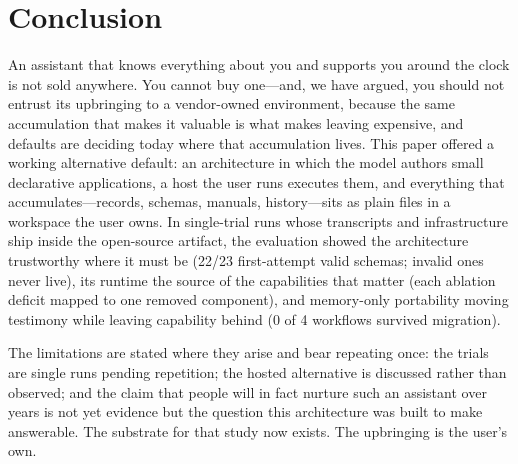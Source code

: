 \documentclass[11pt]{article}
\begin{document}
\section{Conclusion}
\label{sec:conclusion}

An assistant that knows everything about you and supports you around the clock
is not sold anywhere. You cannot buy one---and, we have argued, you should not
entrust its upbringing to a vendor-owned environment, because the same
accumulation that makes it valuable is what makes
leaving expensive, and defaults are deciding today where that accumulation lives.
This paper offered a working alternative default: an architecture in which the
model authors small declarative applications, a host the user runs executes them,
and everything that accumulates---records, schemas, manuals, history---sits as
plain files in a workspace the user owns. In single-trial runs whose transcripts
and infrastructure ship inside the open-source artifact, the evaluation showed
the architecture trustworthy where it must be (22/23 first-attempt valid schemas;
invalid ones never live), its runtime the source of the capabilities that matter
(each ablation deficit mapped to one removed component), and memory-only
portability moving testimony while leaving capability behind (0 of 4 workflows
survived migration).

The limitations are stated where they arise and bear repeating once: the trials
are single runs pending repetition; the hosted alternative is
discussed rather than observed; and the claim that people will in fact nurture
such an assistant over years is not yet evidence but the question this
architecture was built to make answerable. The substrate for that study now
exists. The upbringing is the user's own.



\end{document}
